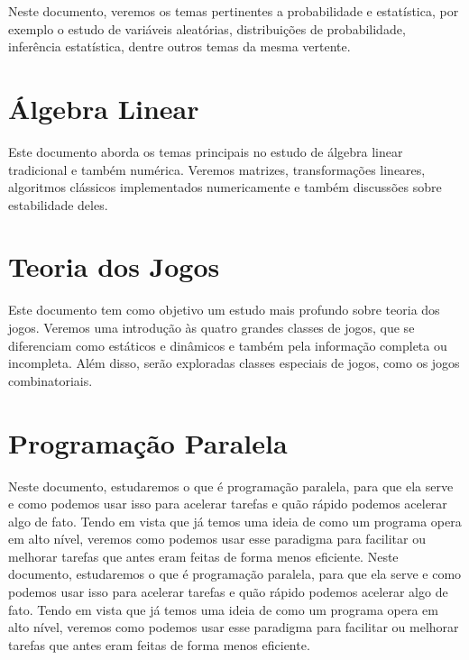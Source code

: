 \documentclass[11pt, a4paper]{article}
\begin{document}
Neste documento, veremos os temas pertinentes a probabilidade e estatística, por exemplo o estudo de variáveis aleatórias, distribuições de probabilidade, inferência estatística, dentre outros temas da mesma vertente.

\section{Álgebra Linear}

Este documento aborda os temas principais no estudo de álgebra linear tradicional e também numérica. Veremos matrizes, transformações lineares, algoritmos clássicos implementados numericamente e também discussões sobre estabilidade deles.

\section{Teoria dos Jogos}

Este documento tem como objetivo um estudo mais profundo sobre teoria dos jogos. Veremos uma introdução às quatro grandes classes de jogos, que se diferenciam como estáticos e dinâmicos e também pela informação completa ou incompleta. Além disso, serão exploradas classes especiais de jogos, como os jogos combinatoriais.

\section{Programação Paralela}

Neste documento, estudaremos o que é programação paralela, para que ela serve e como podemos usar isso para acelerar tarefas e quão rápido podemos acelerar algo de fato. Tendo em vista que já temos uma ideia de como um programa opera em alto nível, veremos como podemos usar esse paradigma para facilitar ou melhorar tarefas que antes eram feitas de forma menos eficiente.
Neste documento, estudaremos o que é programação paralela, para que ela serve e como podemos usar isso para acelerar tarefas e quão rápido podemos acelerar algo de fato. Tendo em vista que já temos uma ideia de como um programa opera em alto nível, veremos como podemos usar esse paradigma para facilitar ou melhorar tarefas que antes eram feitas de forma menos eficiente.
\end{document}

